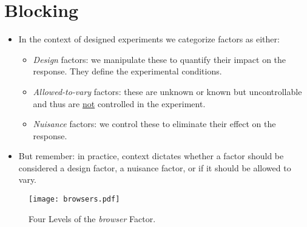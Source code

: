 \chapter{Blocking}
\begin{itemize}
      \item In the context of designed experiments we categorize factors as either:
            \begin{itemize}
                  \item \emph{Design} factors: we manipulate these to quantify their impact on the response.
                        They define the experimental conditions.
                  \item \emph{Allowed-to-vary} factors: these are unknown or known but uncontrollable and thus
                        are \underline{not} controlled in the experiment.
                  \item \emph{Nuisance} factors: we control these to eliminate their effect on the response.
            \end{itemize}
      \item But remember: in practice, context dictates whether a factor should be considered a design factor, a
            nuisance factor, or if it should be allowed to vary.
\end{itemize}
\begin{figure}[!htbp]
      \centering
      \texttt{[image: browsers.pdf]}
      \caption{Four Levels of the \emph{browser} Factor.}
\end{figure}

